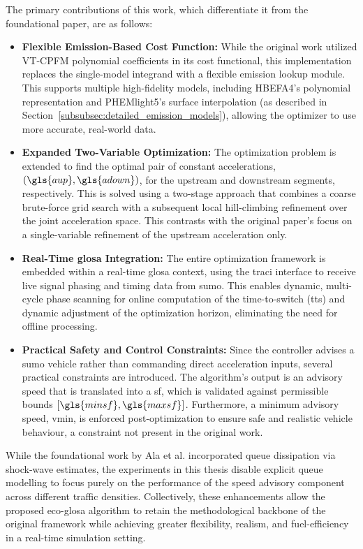 The primary contributions of this work, which differentiate it from the foundational paper, are as follows:
\begin{itemize}
    \item \textbf{Flexible Emission-Based Cost Function:} While the original work utilized VT-CPFM polynomial coefficients in its cost functional, this implementation replaces the single-model integrand with a flexible emission lookup module. This supports multiple high-fidelity models, including HBEFA4’s polynomial representation and PHEMlight5’s surface interpolation (as described in Section~\vref{subsubsec:detailed_emission_models}), allowing the optimizer to use more accurate, real-world data.
    
    \item \textbf{Expanded Two-Variable Optimization:} The optimization problem is extended to find the optimal pair of constant accelerations, $(\gls{aup}, \gls{adown})$, for the upstream and downstream segments, respectively. This is solved using a two-stage approach that combines a coarse brute-force grid search with a subsequent local hill-climbing refinement over the joint acceleration space. This contrasts with the original paper's focus on a single-variable refinement of the upstream acceleration only.

    \item \textbf{Real-Time \ac{glosa} Integration:} The entire optimization framework is embedded within a real-time \ac{glosa} context, using the \ac{traci} interface to receive live signal phasing and timing data from \ac{sumo}. This enables dynamic, multi-cycle phase scanning for online computation of the time-to-switch (\gls{tts}) and dynamic adjustment of the optimization horizon, eliminating the need for offline processing.

    \item \textbf{Practical Safety and Control Constraints:} Since the controller advises a \ac{sumo} vehicle rather than commanding direct acceleration inputs, several practical constraints are introduced. The algorithm's output is an advisory speed that is translated into a \gls{sf}, which is validated against permissible bounds $[\gls{minsf}, \gls{maxsf}]$. Furthermore, a minimum advisory speed, \gls{vmin}, is enforced post-optimization to ensure safe and realistic vehicle behaviour, a constraint not present in the original work.
\end{itemize}




While the foundational work by Ala et al. \cite{Ala2016} incorporated queue dissipation via shock-wave estimates, the experiments in this thesis disable explicit queue modelling to focus purely on the performance of the speed advisory component across different traffic densities. Collectively, these enhancements allow the proposed \ac{eco-glosa} algorithm to retain the methodological backbone of the original framework while achieving greater flexibility, realism, and fuel-efficiency in a real-time simulation setting.

